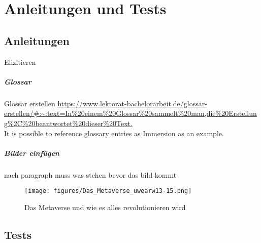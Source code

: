 \chapter{Anleitungen und Tests}\label{ch:Anleitungen}

\section{Anleitungen}

\glqq Elizitieren\grqq{}

\paragraph*{Glossar}

Glossar erstellen \url{https://www.lektorat-bachelorarbeit.de/glossar-erstellen/#:~:text=In%20einem%20Glossar%20sammelt%20man,die%20Erstellung%2C%20beantwortet%20dieser%20Text.} \\
It is possible to reference glossary entries as \gls{Immersion} as an example.

\paragraph{Bilder einfügen}
nach paragraph muss was stehen bevor das bild kommt

\begin{figure}[!h]
    \centering
\texttt{[image: figures/Das\_Metaverse\_uwearw13-15.png]}
\caption{Das Metaverse und wie es alles revolutionieren wird}
\cite{Ball22}
\label{fig:testbild}
\end{figure}





%


\section*{Tests}

